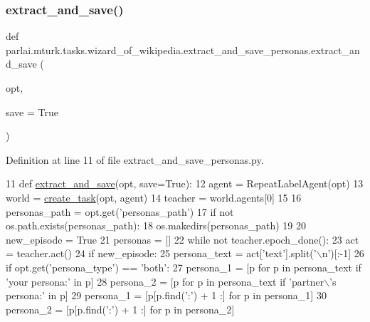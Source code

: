 \subsubsection{\texorpdfstring{extract\+\_\+and\+\_\+save()}{extract\_and\_save()}}
{\footnotesize\ttfamily def parlai.\+mturk.\+tasks.\+wizard\+\_\+of\+\_\+wikipedia.\+extract\+\_\+and\+\_\+save\+\_\+personas.\+extract\+\_\+and\+\_\+save (\begin{DoxyParamCaption}\item[{}]{opt,  }\item[{}]{save = {\ttfamily True} }\end{DoxyParamCaption})}



Definition at line 11 of file extract\+\_\+and\+\_\+save\+\_\+personas.\+py.


\begin{DoxyCode}
11 \textcolor{keyword}{def }\hyperlink{namespacepersonachat__eval_1_1extract__and__save__personas_a7bae99c34a0b3f49cbce1328146926fd}{extract\_and\_save}(opt, save=True):
12     agent = RepeatLabelAgent(opt)
13     world = \hyperlink{namespaceparlai_1_1core_1_1worlds_a11923c10b545c7ecc1b08fe2242d9c2c}{create\_task}(opt, agent)
14     teacher = world.agents[0]
15 
16     personas\_path = opt.get(\textcolor{stringliteral}{'personas\_path'})
17     \textcolor{keywordflow}{if} \textcolor{keywordflow}{not} os.path.exists(personas\_path):
18         os.makedirs(personas\_path)
19 
20     new\_episode = \textcolor{keyword}{True}
21     personas = []
22     \textcolor{keywordflow}{while} \textcolor{keywordflow}{not} teacher.epoch\_done():
23         act = teacher.act()
24         \textcolor{keywordflow}{if} new\_episode:
25             persona\_text = act[\textcolor{stringliteral}{'text'}].split(\textcolor{stringliteral}{'\(\backslash\)n'})[:-1]
26             \textcolor{keywordflow}{if} opt.get(\textcolor{stringliteral}{'persona\_type'}) == \textcolor{stringliteral}{'both'}:
27                 persona\_1 = [p \textcolor{keywordflow}{for} p \textcolor{keywordflow}{in} persona\_text \textcolor{keywordflow}{if} \textcolor{stringliteral}{'your persona:'} \textcolor{keywordflow}{in} p]
28                 persona\_2 = [p \textcolor{keywordflow}{for} p \textcolor{keywordflow}{in} persona\_text \textcolor{keywordflow}{if} \textcolor{stringliteral}{'partner\(\backslash\)'s persona:'} \textcolor{keywordflow}{in} p]
29                 persona\_1 = [p[p.find(\textcolor{stringliteral}{':'}) + 1 :] \textcolor{keywordflow}{for} p \textcolor{keywordflow}{in} persona\_1]
30                 persona\_2 = [p[p.find(\textcolor{stringliteral}{':'}) + 1 :] \textcolor{keywordflow}{for} p \textcolor{keywordflow}{in} persona\_2]

\end{DoxyCode}
